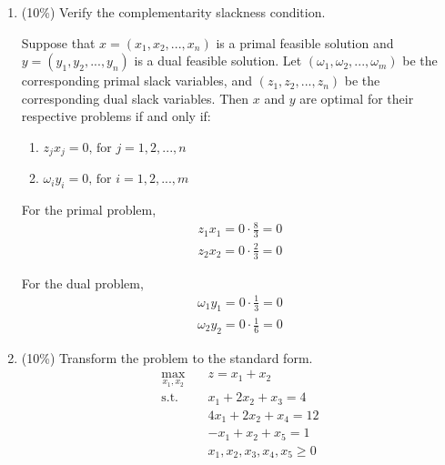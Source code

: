 \documentclass[a4paper,10pt]{article}
\begin{document}
\begin{enumerate}
\begin{enumerate}
        \item (10\%) Verify the complementarity slackness condition.
        {\color{blue}

            Suppose that $x = (x_1, x_2, ..., x_n)$ is a {\color{red}primal feasible} solution and $y = (y_1, y_2, ..., y_n)$ is a {\color{red}dual feasible} solution. 
            Let $(\omega_1, \omega_2, ..., \omega_m)$ be the corresponding primal slack variables, and $(z_1, z_2, ..., z_n)$ be the corresponding dual slack variables.
            Then {\color{red} $x$ and $y$ are optimal} for their respective problems if and only if:
            \begin{enumerate}
                \item $z_j x_j = 0 \text{, for } j = 1,2,...,n$
                \item $\omega_i y_i = 0 \text{, for } i = 1,2,...,m$
            \end{enumerate} 

            For the primal problem, 
            \begin{align}
                z_1 x_1 = 0 \cdot \frac{8}{3} = 0 \\
                z_2 x_2 = 0 \cdot \frac{2}{3} = 0
            \end{align}

            For the dual problem, 
            \begin{align}
                \omega_1 y_1 = 0 \cdot \frac{1}{3} = 0 \\
                \omega_2 y_2 = 0 \cdot \frac{1}{6} = 0
            \end{align}
        }

        \item (10\%) Transform the problem to the standard form.
        {\color{blue} 
            \begin{equation}
                \begin{aligned}
                    \max_{x_1,x_2} \quad & z = x_1+x_2 \\
                    \textrm{s.t.} \quad & x_1 + 2x_2 + x_3 = 4 \\
                        \quad & 4x_1 + 2x_2 + x_4 =  12   \\
                        \quad & -x_1 + x_2 + x_5 = 1  \\
                        \quad & x_1, x_2, x_3, x_4, x_5 \geq 0
                \end{aligned}
            \end{equation}
        }


\end{enumerate}
\end{enumerate}
\end{document}
